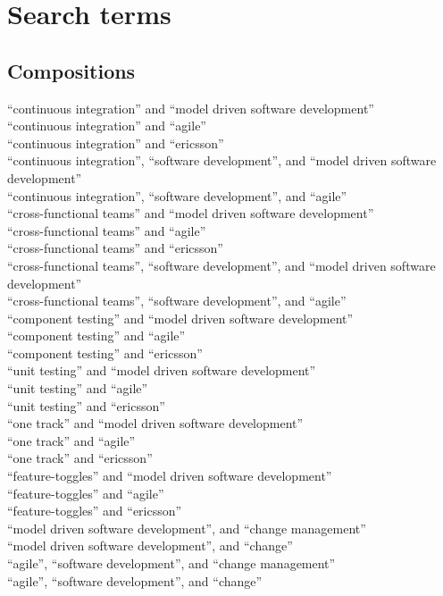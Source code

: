 \documentclass[final_report_innit.tex]{subfiles}
\begin{document}
\section{Search terms}\label{appendixSearchTerms}
\subsection{Compositions}



\noindent
``continuous integration'' and ``model driven software development'' \\
``continuous integration'' and ``agile'' \\
``continuous integration'' and ``ericsson'' \\
``continuous integration'', ``software development'', and ``model driven software development'' \\
``continuous integration'', ``software development'', and ``agile'' \\
``cross-functional teams'' and ``model driven software development'' \\
``cross-functional teams'' and ``agile'' \\
``cross-functional teams'' and ``ericsson'' \\
``cross-functional teams'', ``software development'', and ``model driven software development'' \\
``cross-functional teams'', ``software development'', and ``agile'' \\
``component testing'' and ``model driven software development'' \\
``component testing'' and ``agile'' \\
``component testing'' and ``ericsson'' \\
``unit testing'' and ``model driven software development'' \\
``unit testing'' and ``agile'' \\
``unit testing'' and ``ericsson'' \\
``one track'' and ``model driven software development'' \\
``one track'' and ``agile'' \\
``one track'' and ``ericsson'' \\
``feature-toggles'' and ``model driven software development'' \\
``feature-toggles'' and ``agile'' \\
``feature-toggles'' and ``ericsson'' \\
``model driven software development'', and ``change management'' \\
``model driven software development'', and ``change'' \\
``agile'', ``software development'', and ``change management'' \\
``agile'', ``software development'', and ``change'' \\



\clearpage
\end{document}
